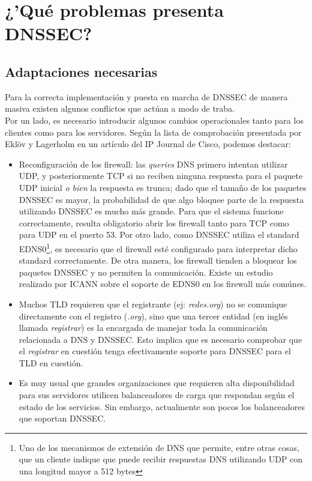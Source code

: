 \chapter{¿'Qu\'e problemas presenta DNSSEC?}
\section{Adaptaciones necesarias}
Para la correcta implementaci\'on y puesta en marcha de DNSSEC de manera masiva existen algunos conflictos que act\'uan a modo de traba.\\
Por un lado, es necesario introducir algunos cambios operacionales tanto para los clientes como para los servidores. Seg\'un la lista de comprobaci\'on presentada por Ekl\"{o}v y Lagerholm en un art\'iculo del IP Journal de Cisco\cite{imp2011}, podemos destacar:
\begin{itemize}
 \item Reconfiguraci\'on de los firewall: las \textit{queries} DNS primero intentan utilizar UDP, y posteriormente TCP si no reciben ninguna respuesta para el paquete UDP inicial \textit{o bien} la respuesta es trunca; dado que el tama\~no de los paquetes DNSSEC es mayor, la probabilidad de que algo bloquee parte de la respuesta utilizando DNSSEC es mucho m\'as grande. Para que el sistema funcione correctamente, resulta obligatorio abrir los firewall tanto para TCP como para UDP en el puerto 53. Por otro lado, como DNSSEC utiliza el standard EDNS0\footnote{Uno de los mecanismos de extensi\'on de DNS que permite, entre otras cosas, que un cliente indique que puede recibir respuestas DNS utilizando UDP con una longitud mayor a 512 bytes}, es necesario que el firewall est\'e configurado para interpretar dicho standard correctamente. De otra manera, los firewall tienden a bloquear los paquetes DNSSEC y no permiten la comunicaci\'on. Existe un estudio realizado por ICANN sobre el soporte de EDNS0 en los firewall m\'as com\'unes\cite{icann07}.
 \item Muchos TLD requieren que el registrante (ej: \textit{redes.org}) no se comunique directamente con el registro (\textit{.org}), sino que una tercer entidad (en ingl\'es llamada \textit{registrar}) es la encargada de manejar toda la comunicaci\'on relacionada a DNS y DNSSEC. Esto implica que es necesario comprobar que el \textit{registrar} en cuesti\'on tenga efectivamente soporte para DNSSEC para el TLD en cuesti\'on.
 \item Es muy usual que grandes organizaciones que requieren alta disponibilidad para sus servidores utilicen balanceadores de carga que respondan seg\'un el estado de los servicios. Sin embargo, actualmente son pocos los balanceadores que soportan DNSSEC.
\end{itemize}

